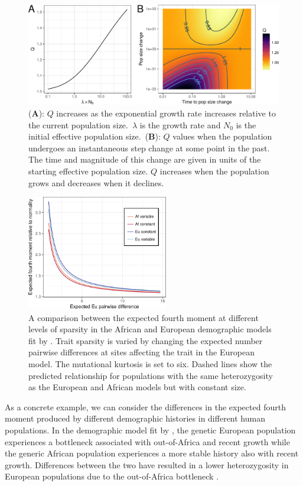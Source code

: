 \begin{figure}
\centering
\includegraphics[width=\textwidth]{figures/combo_q.pdf}
\caption{\small (\textbf{A}): $Q$ increases as the exponential growth rate increases relative to the current
population size.~$\lambda$ is the growth rate and $N_0$ is the initial effective
population size.~(\textbf{B}): $Q$ values when the population undergoes an
instantaneous step change at some point in the past. The time and magnitude of
this change are given in units of the starting effective population size. $Q$
increases when the population grows and decreases when it declines.
}
\label{fig:Qexp}
\end{figure}

\begin{figure}
\centering
\includegraphics[width=0.55\textwidth]{figures/af_eu_mom4_r.pdf}
\caption{\small A comparison between the expected fourth moment at different levels of
sparsity in the African and European demographic models fit by \citet{Tennessen2012}.
Trait sparsity is varied by changing the expected
number pairwise differences at sites affecting the trait in the European model.
The mutational kurtosis is set to six. Dashed lines show the predicted
relationship for populations with the same heterozygosity as the European and
African models but with constant size.}
\label{fig:afeucomp}
\end{figure}

As a concrete example, we can consider the differences in the expected fourth
moment produced by different demographic histories in different human
populations. In the demographic model fit by \citet{Tennessen2012}, the genetic
European population experiences a bottleneck associated with out-of-Africa and
recent growth while the generic African population experiences a more stable
history also with recent growth. Differences between the two have resulted in a
lower heterozygosity in European populations due to the out-of-Africa
bottleneck \citep{Yu2002}.

